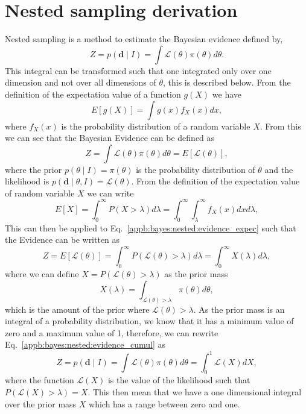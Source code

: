 \chapter{\label{appb} Nested sampling derivation}

Nested sampling is a method to estimate the Bayesian evidence defined by,
\begin{equation}
\label{appb:bayes:evidence}
Z = p(\bm{d} \mid I) = \int \mathcal{L}(\theta) \pi(\theta) d\theta.
\end{equation}
This integral can be transformed such that one integrated only over one dimension and not over all dimensions of $\theta$, this is described below.
From the definition of the expectation value of a function $g(X)$ we
have
\begin{equation}
  \label{appb:bayes:nested:exectationg}
  E[ g(X) ] = \int g(x) f_X(x) dx,
\end{equation}
where $f_X(x)$ is the probability distribution of a random variable
$X$.
From this we can see that the Bayesian Evidence can be defined as
\begin{equation}
  \label{appb:bayes:nested:evidence_expec}
  Z = \int \mathcal{L}(\theta) \pi(\theta) d\theta
  = E [ \mathcal{L}(\theta)],
\end{equation}
where the prior $p(\theta \mid I) = \pi(\theta)$ is the probability
distribution of $\theta$ and the likelihood is $p(\bm{d} \mid \theta,
I) = \mathcal{L}(\theta)$.
From the definition of the expectation value of random variable $X$ we
can write
\begin{equation}
  \label{appb:bayes:nested:exectationx}
  E[X] = \int_0^{\infty} P(X > \lambda) d\lambda = \int_0^{\infty}
  \int_{\lambda}^{\infty} f_X(x) dx d\lambda,
\end{equation}
This can then be applied to
Eq.~\ref{appb:bayes:nested:evidence_expec} such that the Evidence
can be written as
\begin{equation}
  \label{appb:bayes:nested:evidence_cumul}
  Z = E[\mathcal{L}(\theta)] = \int_0^{\infty}  P(\mathcal{L}(\theta)
  > \lambda) d\lambda = \int_0^{\infty}  X(\lambda) d\lambda ,
\end{equation}
where we can define $X = P(\mathcal{L}(\theta) > \lambda)$ as the
prior mass
\begin{equation}
  \label{appb:bayes:nested:priormass}
  X(\lambda) = \int_{\mathcal{L}(\theta) > \lambda} \pi(\theta)
  d\theta,
\end{equation}
which is the amount of the prior where $\mathcal{L}(\theta) >
\lambda$.
As the prior mass is an integral of a probability distribution, we
know that it has a minimum value of zero and a maximum value of 1,
therefore, we can rewrite
Eq.~\ref{appb:bayes:nested:evidence_cumul} as
\begin{equation}
  \label{appb:bayes:nested:evidence}
  Z = p(\bm{d} \mid I) = \int \mathcal{L}(\theta) \pi(\theta) d\theta
  = \int_0^1 \mathcal{L}(X) dX,
\end{equation}
where the function $\mathcal{L}(X)$ is the value of the likelihood
such that $P(\mathcal{L}(X) > \lambda) = X$.
This then mean that we have a one dimensional integral over the prior
mass $X$ which has a range between zero and one.